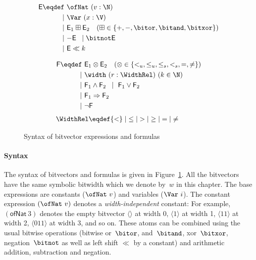 \begin{figure}[tb]
  \begin{minipage}[t]{.5\textwidth}
    \begin{align*}
      \mathsf{E} \eqdef~&\ofNat~(v : \N) \\
      \mid~&\Var~(x : \V) \\
      \mid~&\mathsf{E}_1 \boxplus \mathsf{E}_2 \quad (\boxplus \in \{+, -, \bitor, \bitand, \bitxor\}) \\
      \mid~& {- \mathsf{E}} \;\; \mid {\bitnot \mathsf{E}} \\
      \mid~& {\mathsf{E} \ll k}
    \end{align*}
  \end{minipage}%
  \begin{minipage}[t]{.5\textwidth}
    \begin{align*}
      \mathsf{F} \eqdef~& \mathsf{E}_1 \otimes \mathsf{E}_2 \quad (\otimes \in \{<_u, \leq_u, \leq_s, <_s, =, \neq \}) \\
      \mid~&{\width~(r : \WidthRel)~(k \in \N)} \\
      \mid~&\mathsf{F}_1 \land \mathsf{F}_2 \;\; \mid~\mathsf{F}_1 \lor \mathsf{F}_2 \\
      \mid~&\mathsf{F}_1 \Rightarrow \mathsf{F}_2 \\
      \mid~&{\neg \mathsf{F}}
    \end{align*}
    \begin{align*}
      \WidthRel \eqdef {<} \mid {\leq} \mid {>} \mid {\geq} \mid {=} \mid
      {\neq}\qquad\quad\;
    \end{align*}
  \end{minipage}
  \caption{Syntax of bitvector expressions and formulas}
  \label{fig:swbv:syntax-formula}
\end{figure}

\paragraph{Syntax}
The syntax of bitvectors and formulas is given in
Figure~\ref{fig:swbv:syntax-formula}.
%
All the bitvectors have the same symbolic bitwidth which we denote by~$w$ in
this chapter.
%
The base expressions are constants ($\ofNat~v$) and variables ($\Var~i$).
The constant expression $(\ofNat~v)$ denotes a \emph{width-independent}
constant: For example, $(\mathsf{ofNat}~3)$ denotes the empty bitvector $\langle
\rangle$ at width 0,  $\langle1\rangle$ at width 1, $\langle 11 \rangle$ at
width 2, $\langle 011 \rangle$ at width 3, and so on. These atoms can be
combined using the usual bitwise operations (bitwise or~$\bitor$, and~$\bitand$,
xor~$\bitxor$, negation~$\bitnot$ as well as left shift $\ll$ by a constant) and
arithmetic addition, subtraction and negation.

